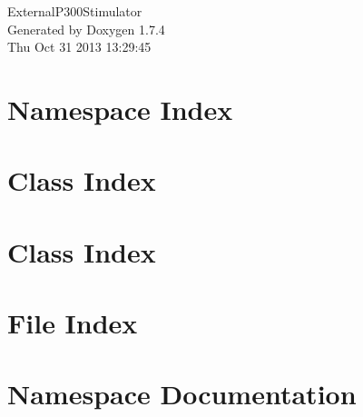 \documentclass[a4paper]{book}
\begin{document}
\hypersetup{pageanchor=false}
\begin{titlepage}
\vspace*{7cm}
\begin{center}
{\Large ExternalP300Stimulator }\\
\vspace*{1cm}
{\large Generated by Doxygen 1.7.4}\\
\vspace*{0.5cm}
{\small Thu Oct 31 2013 13:29:45}\\
\end{center}
\end{titlepage}
\clearemptydoublepage
{}
\tableofcontents
\clearemptydoublepage
{}
\hypersetup{pageanchor=true}
\chapter{Namespace Index}

\chapter{Class Index}

\chapter{Class Index}

\chapter{File Index}

\chapter{Namespace Documentation}


\end{document}
